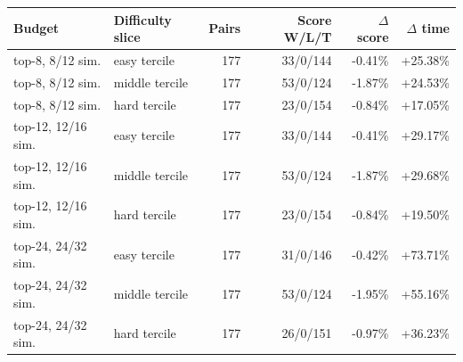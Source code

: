 \begin{tabular}{llrrrr}
\toprule
Budget & Difficulty slice & Pairs & Score W/L/T & $\Delta$ score & $\Delta$ time \\
\midrule
top-8, 8/12 sim. & easy tercile & 177 & 33/0/144 & -0.41\% & +25.38\% \\
top-8, 8/12 sim. & middle tercile & 177 & 53/0/124 & -1.87\% & +24.53\% \\
top-8, 8/12 sim. & hard tercile & 177 & 23/0/154 & -0.84\% & +17.05\% \\
top-12, 12/16 sim. & easy tercile & 177 & 33/0/144 & -0.41\% & +29.17\% \\
top-12, 12/16 sim. & middle tercile & 177 & 53/0/124 & -1.87\% & +29.68\% \\
top-12, 12/16 sim. & hard tercile & 177 & 23/0/154 & -0.84\% & +19.50\% \\
top-24, 24/32 sim. & easy tercile & 177 & 31/0/146 & -0.42\% & +73.71\% \\
top-24, 24/32 sim. & middle tercile & 177 & 53/0/124 & -1.95\% & +55.16\% \\
top-24, 24/32 sim. & hard tercile & 177 & 26/0/151 & -0.97\% & +36.23\% \\
\bottomrule
\end{tabular}
